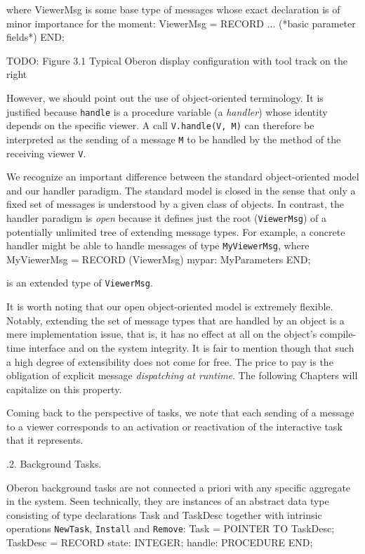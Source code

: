 \noindent where ViewerMsg is some base type of messages whose exact declaration is of minor importance for the moment:
\begintt
ViewerMsg = RECORD ... (*basic parameter fields*) END;
\endtt

TODO: Figure 3.1 Typical Oberon display configuration with tool track on the right

However, we should point out the use of object-oriented
terminology. It is justified because {\tt handle\/} is a procedure variable (a
{\it handler\/}) whose identity depends on the specific viewer. A call
{\tt V.handle(V, M)} can therefore be interpreted as the sending of a
message {\tt M\/} to be handled by the method of the receiving viewer {\tt V\/}.

We recognize an important difference between the standard
object-oriented model and our handler paradigm. The standard model is
closed in the sense that only a fixed set of messages is understood by
a given class of objects. In contrast, the handler paradigm is {\it open\/}
because it defines just the root ({\tt ViewerMsg\/}) of a potentially
unlimited tree of extending message types. For example, a concrete
handler might be able to handle messages of type {\tt MyViewerMsg\/}, where
\begintt
MyViewerMsg = RECORD (ViewerMsg)
  mypar: MyParameters
END;
\endtt

\noindent is an extended type of {\tt ViewerMsg\/}.

It is worth noting that our open object-oriented model is extremely
flexible. Notably, extending the set of message types that are handled
by an object is a mere implementation issue, that is, it has no effect
at all on the object’s compile-time interface and on the system
integrity. It is fair to mention though that such a high degree of
extensibility does not come for free. The price to pay is the
obligation of explicit message {\it dispatching at runtime\/}. The following
Chapters will capitalize on this property.

Coming back to the perspective of tasks, we note that each sending of
a message to a viewer corresponds to an activation or reactivation of
the interactive task that it represents.

.2. Background Tasks.

Oberon background tasks are not connected a priori with any specific
aggregate in the system. Seen technically, they are instances of an
abstract data type consisting of type declarations Task and TaskDesc
together with intrinsic operations {\tt NewTask\/}, {\tt Install\/} and {\tt Remove\/}:
\begintt
Task = POINTER TO TaskDesc;
TaskDesc = RECORD state: INTEGER; handle: PROCEDURE END;

